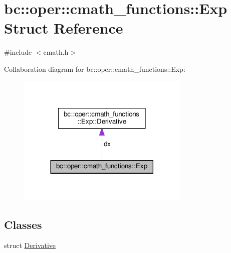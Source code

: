 \hypertarget{structbc_1_1oper_1_1cmath__functions_1_1Exp}{}\section{bc\+:\+:oper\+:\+:cmath\+\_\+functions\+:\+:Exp Struct Reference}
\label{structbc_1_1oper_1_1cmath__functions_1_1Exp}


{\ttfamily \#include $<$cmath.\+h$>$}



Collaboration diagram for bc\+:\+:oper\+:\+:cmath\+\_\+functions\+:\+:Exp\+:\nopagebreak
\begin{figure}[H]
\begin{center}
\leavevmode
\includegraphics[width=233pt]{structbc_1_1oper_1_1cmath__functions_1_1Exp__coll__graph}
\end{center}
\end{figure}
\subsection*{Classes}
\begin{DoxyCompactItemize}
\item 
struct \hyperlink{structbc_1_1oper_1_1cmath__functions_1_1Exp_1_1Derivative}{Derivative}
\end{DoxyCompactItemize}
